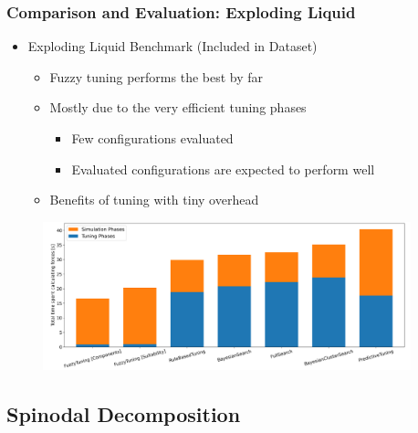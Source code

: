\documentclass[
	10pt,
	t		%
]{beamer}
\begin{document}
\begin{frame}
	\frametitle{Comparison and Evaluation: Exploding Liquid}
	\begin{itemize}
		\item Exploding Liquid Benchmark (Included in Dataset)
		      \begin{itemize}
			      \item Fuzzy tuning performs the best by far
			      \item Mostly due to the very efficient tuning phases
			            \begin{itemize}
				            \item Few configurations evaluated
				            \item Evaluated configurations are expected to perform well
			            \end{itemize}
			      \item Benefits of tuning with tiny overhead
		      \end{itemize}
	\end{itemize}

	\begin{figure}
		\centering
		\includegraphics[width=0.95\textwidth]{figures/exploding-liquid-total.png}
	\end{figure}
\end{frame}

\subsection{Spinodal Decomposition}
\end{document}
